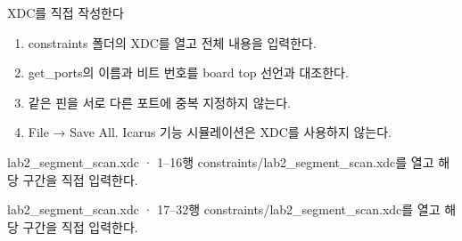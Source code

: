 \begin{frame}{XDC를 직접 작성한다}
\small
\begin{enumerate}
\item constraints 폴더의 XDC를 열고 전체 내용을 입력한다.
\item get\_ports의 이름과 비트 번호를 board top 선언과 대조한다.
\item 같은 핀을 서로 다른 포트에 중복 지정하지 않는다.
\item File → Save All. Icarus 기능 시뮬레이션은 XDC를 사용하지 않는다.
\end{enumerate}
\end{frame}

\begin{frame}{lab2\_segment\_scan.xdc · 1–16행}
\small
constraints/lab2\_segment\_scan.xdc를 열고 해당 구간을 직접 입력한다.\par\vspace{0.4cm}\par\vspace{0.4cm}
\end{frame}

\begin{frame}{lab2\_segment\_scan.xdc · 17–32행}
\small
constraints/lab2\_segment\_scan.xdc를 열고 해당 구간을 직접 입력한다.\par\vspace{0.4cm}\par\vspace{0.4cm}
\end{frame}


